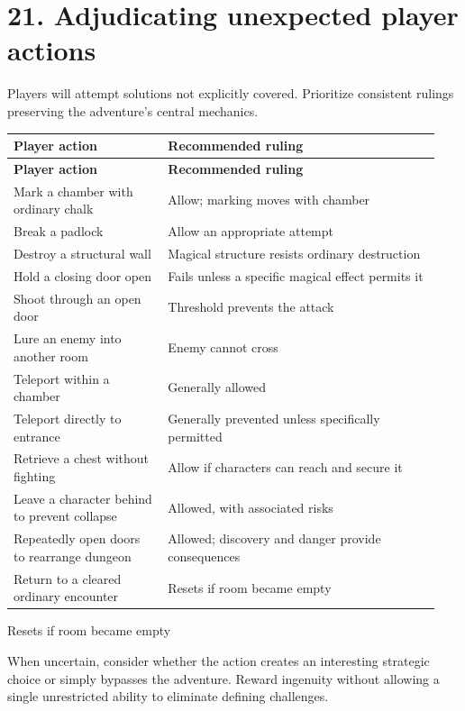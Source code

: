 \section{21. Adjudicating unexpected player actions}

Players will attempt solutions not explicitly covered. Prioritize consistent rulings preserving the adventure's central mechanics.

\begin{longtable}{p{0.34\linewidth}p{0.60\linewidth}}
\rowcolor{tablehead} \textbf{Player action} & \textbf{Recommended ruling} \\
\endfirsthead
\rowcolor{tablehead} \textbf{Player action} & \textbf{Recommended ruling} \\
\endhead
Mark a chamber with ordinary chalk & Allow; marking moves with chamber \\
Break a padlock & Allow an appropriate attempt \\
Destroy a structural wall & Magical structure resists ordinary destruction \\
Hold a closing door open & Fails unless a specific magical effect permits it \\
Shoot through an open door & Threshold prevents the attack \\
Lure an enemy into another room & Enemy cannot cross \\
Teleport within a chamber & Generally allowed \\
Teleport directly to entrance & Generally prevented unless specifically permitted \\
Retrieve a chest without fighting & Allow if characters can reach and secure it \\
Leave a character behind to prevent collapse & Allowed, with associated risks \\
Repeatedly open doors to rearrange dungeon & Allowed; discovery and danger provide consequences \\
Return to a cleared ordinary encounter & Resets if room became empty \\
\end{longtable}

Resets if room became empty

When uncertain, consider whether the action creates an interesting strategic choice or simply bypasses the adventure. Reward ingenuity without allowing a single unrestricted ability to eliminate defining challenges.
